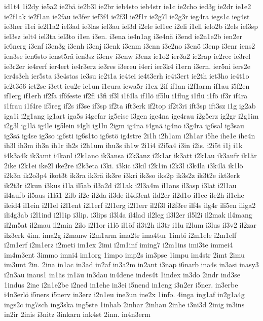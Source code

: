 {id1t4
1i2dy
ie5a2
ie2bä
ie2b3l
ie2br
ieb4sto
ieb4str
ie1c
ie2cho
ied3g
ie2dr
ie1e2
ie2f1ak
ie2f1an
ie2fau
ie3fer
ief3f4
ie2f3l
ie2f1r
ie2g7l
ie2g3r
ieg4ra
iegs1c
ieg4st
ie3her
i1ei
ie2l1a2
iel3ad
ie3las
iel3au
iel3d
i2ele
iel1ec
i2eli
i1ell
ielo2b
i2els
iel3sp
iel3sz
ielt4
iel3ta
iel3to
i1en
i3en.
i3ena
ie4n1ag
i3e4nä
i3end
ie2n1e2b
ien2er
ie6nerg
i3enf
i3en3g
i3enh
i3enj
i3enk
i3enm
i3enn
i3e2no
i3enö
i3enp
i3enr
iens2
ien3se
ien6sto
ienst5rä
ien3sz
i3env
i3enw
i3enz
ie1o2
ier3a2
ie2rap
ie2rec
ie3rel
ie3r2er
ie4rerf
ier4ert
ie4r3erz
ie3res
i3ereu
i4eri
ier3k4
i1ern
i3ern.
ier5ni
iers2e
ier4s3eh
ier5sta
i3e4stas
ie3su
ie2t1a
ie4tei
ie4t3erh
ie4t3ert
ie2th
iet3ho
ie4t1o
ie2t3ö6
iet2se
i3ett
ieu2e
ie1un
i1eura
iewa5r
i1ex
2if
if1an
i2f1arm
if1au
i5f2en
if1erg
if1erh
if2fa
if6feste
if2fl
i3fi
if3l
i1f4la
if1lö
if5lu
i1flug
i1flü
i1fö
if3r
if4ra
i1frau
i1f4re
if5reg
if2s
if3se
if3sp
if2ta
ift3erk
if2top
if2t3ri
ift3sp
ift3sz
i1g
ig2ab
iga1i
i2g1ang
ig1art
iga5s
i4gefar
ig5eise
i3gen
ige4na
ige4rau
i2g5erz
ig2gr
i2g1im
i2g3l
ig1lä
ig4le
ig5lein
i4gli
ig1lu
2igm
ig4na
i4gnä
ig4no
i3g4ra
ig6sal
ig3sau
ig3sä
ig4se
ig3so
ig6sti
ig6s1to
ig6stö
ig4stre
2i1h
i2h1am
i2h1ar
i5he
ihe1e
ihe4n
ih3l
ih3m
ih3n
ih1r
ih2s
i2h1um
ihu3s
ih1w
2i1i4
i2i5a4
i3in
i2is.
i2i5t
i1j
i1k
i4k3a4k
ik3amt
i4kanl
i2k1ano
ik3ansa
i2k3anz
i2k1ar
ik3att
i2k1au
ik3aufr
ik1är
2ike
i2k1ei
ike2l
ike2re
i2k3eta
i3ki.
i3kic
i3kil
i2k1in
i2k3l
i3k4la
i3k4lä
ik1lö
i2k3n
ik2o3p4
ikot3t
ik3ra
ik3rä
ik3re
i3kri
ik3so
iks2p
ik3s2z
ik3t2e
ikt3erk
ik2t3r
i2kun
i3kus
i1la
il5ab
il3a2d
i2l1ak
i2l3a4m
il1ans
il3asp
i3lat
i2l1au
il4aufb
il5aus
i1lä1
2ilb
il2c
il2da
il3de
il4d3ent
ild2er
il2d1o
il1ec
ile2h
il1ehe
ileid4
il1ein
i2l1el
i2l1ent
i2l1erf
i2l1erg
i2l1err
il2f3l
il2f3re
ilf4s
ilg4r
ili5en
iliga2
ili4g3ab
i2l1ind
i2l1ip
i3lip.
i3lips
il3l4a
il4lad
il2leg
il3l2er
il5l2i
il2mak
il4mang
il2m5at
il2mau
il2min
2ilo
i2l1or
i1lö
il1öf
il3t2h
il3tr
i1lu
i2lum
i3lus
il3v2
il2zar
ilz3erk
4im.
ima2g
i2manw
i2m1arm
ima2tr
ima4tur
1imbi
i2m1ele
i2m1elf
i2m1erf
i2m1erz
i2meti
im1ex
2imi
i2m1inf
iming7
i2m1ins
imi3te
immei4
im4m3ent
3immo
imni4
im1org
1impo
imp2s
im3pse
1impu
im4str
2imt
2imu
im3unt
2in.
2ina
in1ac
in3ad
in2af
in3a2m
in2ant
i3nap
i6narb
ina4s
in3asi
inasy3
i2n3au
inaus1
in1äs
in1äu
in3dau
in4dene
indes4t
1index
in3do
2indr
ind3se
1indus
2ine
i2n1e2be
i2ned
in1ehe
in3ei
i5nend
in1eng
i3n2er
i5ner.
in3erbe
i4n3erlö
i5ners
i5nerv
in3erz
i2n1eu
ine3un
ine2x
1info.
4inga
ing1af
in2g1a4g
ings2c
ing7sch
ing3ska
ing5ste
1inhab
2inhar
2inhau
2inhe
i3ni3d
2inig
in3ins
in2ir
2inis
i3nitz
3inkarn
ink4st
2inn.
in4n3erm
}
